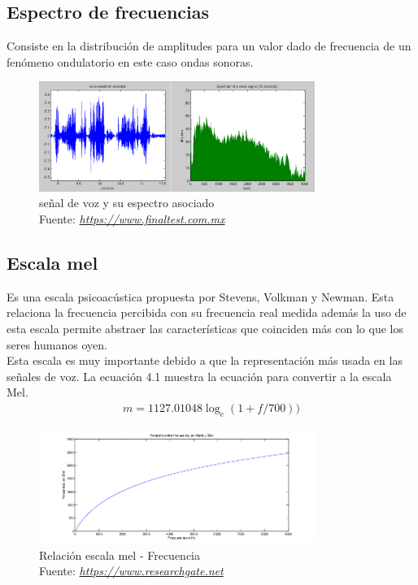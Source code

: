 \subsection{Espectro de frecuencias}
Consiste en la distribución de amplitudes para un valor dado de frecuencia de un fenómeno ondulatorio en este caso ondas sonoras.
\begin{figure}[H]
	\centering
	\includegraphics[width=0.8\textwidth]{Figures/espectro.png}
	\caption{señal de voz y su espectro asociado\\ Fuente:  \href{https://www.finaltest.com.mx/product-p/art-03.htm}{\textit{https://www.finaltest.com.mx}}}
	\label{señal}
\end{figure} 

\subsection{Escala mel}
Es una escala psicoacústica propuesta por Stevens, Volkman y Newman. Esta relaciona la frecuencia percibida con su frecuencia real medida además la uso de esta escala permite abstraer las características que coinciden más con lo que los seres humanos oyen.\\ 
Esta escala es muy importante debido a que la representación más usada en las señales de voz.
La ecuación 4.1 muestra la ecuación para convertir a la escala Mel.
\begin{equation}
\label{STg}
\begin{aligned}
m=1127.01048\log_{e}(1+f/700))
\end{aligned}
\end{equation}


\begin{figure}[H]
	\centering
	\includegraphics[width=0.8\textwidth]{Figures/escala_mel.png}
	\caption{Relación escala mel - Frecuencia\\ Fuente:  \href{https://www.researchgate.net/figure/Relacion-entre-frecuencia-en-Hz-eje-x-y-en-escala-Mel-eje-y_fig2_312041038}{\textit{https://www.researchgate.net}}}
	\label{mel}
\end{figure} 

